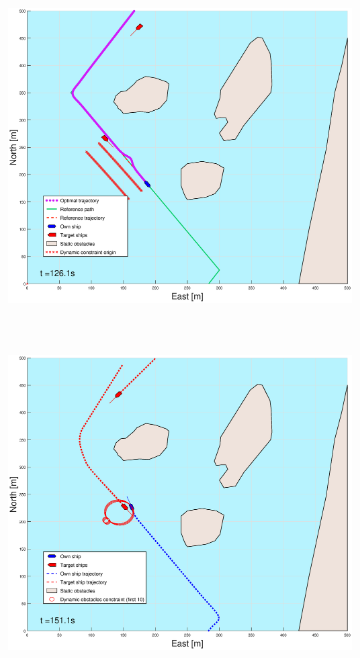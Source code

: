 \begin{figure}[!ht]
\begin{subfigure}[b]{0.49\textwidth}
    \end{subfigure}
    \hfill
    \begin{subfigure}[b]{0.499\textwidth}
        \centering
        \includegraphics[width=\textwidth]{Images/Figures/Helloya/_Simple_0fig999_time=126}
    \end{subfigure}
    \hfill
    \\ 
    \begin{subfigure}[b]{0.49\textwidth}
        \centering
        \includegraphics[width=\textwidth]{Images/Figures/Helloya/_Simple_0fig1_time=151}

\end{subfigure}
\end{figure}
